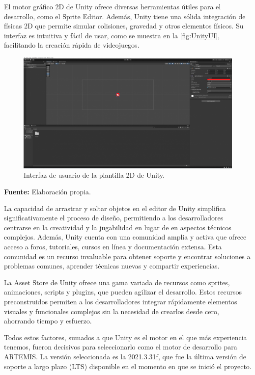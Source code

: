 El motor gráfico 2D de Unity ofrece diversas herramientas útiles para el desarrollo, como el Sprite Editor. Además, Unity tiene una sólida integración de físicas 2D que permite simular colisiones, gravedad y otros elementos físicos. Su interfaz es intuitiva y fácil de usar, como se muestra en la \autoref{fig:UnityUI}, facilitando la creación rápida de videojuegos.

\begin{figure}[h!]
	\centering
	\includegraphics[width=0.7\linewidth]{./Figuras/Aspectos/UnityUI.png}
	\caption{Interfaz de usuario de la plantilla 2D de Unity.}
	\label{fig:UnityUI}
	\vspace{-30pt}
\end{figure}

\begin{center}
	\textbf{Fuente:} Elaboración propia.
\end{center}

La capacidad de arrastrar y soltar objetos en el editor de Unity simplifica significativamente el proceso de diseño, permitiendo a los desarrolladores centrarse en la creatividad y la jugabilidad en lugar de en aspectos técnicos complejos. Además, Unity cuenta con una comunidad amplia y activa que ofrece acceso a foros, tutoriales, cursos en línea y documentación extensa. Esta comunidad es un recurso invaluable para obtener soporte y encontrar soluciones a problemas comunes, aprender técnicas nuevas y compartir experiencias.

La Asset Store de Unity ofrece una gama variada de recursos como sprites, animaciones, scripts y plugins, que pueden agilizar el desarrollo. Estos recursos preconstruidos permiten a los desarrolladores integrar rápidamente elementos visuales y funcionales complejos sin la necesidad de crearlos desde cero, ahorrando tiempo y esfuerzo.

Todos estos factores, sumados a que Unity es el motor en el que más experiencia tenemos, fueron decisivos para seleccionarlo como el motor de desarrollo para ARTEMIS. La versión seleccionada es la 2021.3.31f, que fue la última versión de soporte a largo plazo (LTS) disponible en el momento en que se inició el proyecto.

